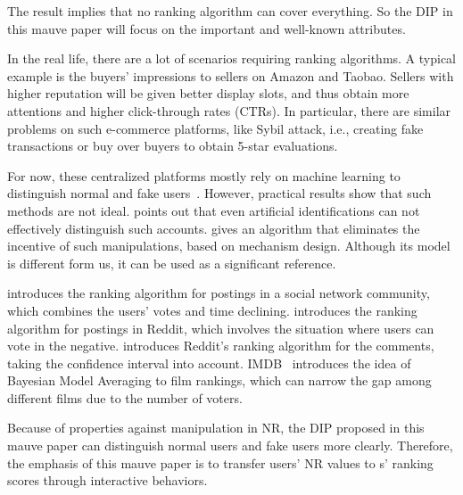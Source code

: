 The result implies that no ranking algorithm can cover everything. So the DIP
in this mauve paper will focus on the important and well-known attributes.

In the real life, there are a lot of scenarios requiring ranking algorithms. A
typical example is the buyers' impressions to sellers on
Amazon and Taobao. Sellers with higher reputation will be given better display
slots, and thus obtain more attentions and higher click-through rates (CTRs). In
particular, there are similar problems on such e-commerce platforms, like Sybil attack, i.e., creating fake transactions or buy over buyers to obtain 5-star evaluations.

For now, these centralized platforms mostly rely on machine learning to
distinguish normal and fake
users~\cite{mukherjee2013spotting,jindal2008opinion,yoo2009comparison}.
However, practical results show that such methods are not ideal.
\cite{ott2011finding} points out that even artificial identifications can not effectively distinguish such accounts.  \cite{cai2016mechanism} gives an
algorithm that eliminates the incentive of such manipulations, based on
mechanism design. Although its model is different form us, it can be used as a significant reference.

\cite{salihefendic2010hacker} introduces the ranking algorithm for postings in
a social network community, which combines the users' votes and time declining.
\cite{salihefendic2010reddit} introduces the ranking algorithm for postings in Reddit, which involves the situation where users can vote in the negative.
\cite{miller2009how} introduces Reddit's ranking algorithm for the comments, taking the confidence interval into account.
IMDB~\cite{IMDB} introduces the idea of Bayesian Model Averaging to film
rankings, which can narrow the gap among different films due to the number of voters.

Because of properties against manipulation in NR, the DIP proposed in this mauve paper can distinguish normal users and fake users more clearly. Therefore, the emphasis of this mauve paper is to transfer users' NR values to {\dapp}s' ranking scores through interactive behaviors.
